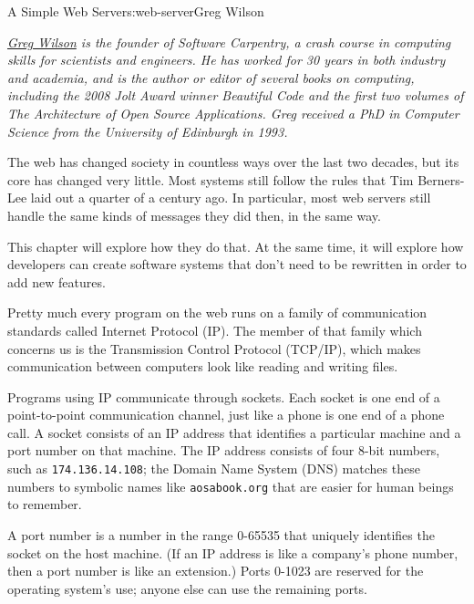 \begin{aosachapter}{A Simple Web Server}{s:web-server}{Greg Wilson}

\emph{\href{https://twitter.com/gvwilson}{Greg Wilson} is the founder of
Software Carpentry, a crash course in computing skills for scientists
and engineers. He has worked for 30 years in both industry and academia,
and is the author or editor of several books on computing, including the
2008 Jolt Award winner \emph{Beautiful Code} and the first two volumes
of \emph{The Architecture of Open Source Applications}. Greg received a
PhD in Computer Science from the University of Edinburgh in 1993.}

\label{introduction}

The web has changed society in countless ways over the last two decades,
but its core has changed very little. Most systems still follow the
rules that Tim Berners-Lee laid out a quarter of a century ago. In
particular, most web servers still handle the same kinds of messages
they did then, in the same way.

This chapter will explore how they do that. At the same time, it will
explore how developers can create software systems that don't need to be
rewritten in order to add new features.

\label{background}

Pretty much every program on the web runs on a family of communication
standards called Internet Protocol (IP). The member of that family which
concerns us is the Transmission Control Protocol (TCP/IP), which makes
communication between computers look like reading and writing files.

Programs using IP communicate through sockets. Each socket is one end of
a point-to-point communication channel, just like a phone is one end of
a phone call. A socket consists of an IP address that identifies a
particular machine and a port number on that machine. The IP address
consists of four 8-bit numbers, such as \texttt{174.136.14.108}; the
Domain Name System (DNS) matches these numbers to symbolic names like
\texttt{aosabook.org} that are easier for human beings to remember.

A port number is a number in the range 0-65535 that uniquely identifies
the socket on the host machine. (If an IP address is like a company's
phone number, then a port number is like an extension.) Ports 0-1023 are
reserved for the operating system's use; anyone else can use the
remaining ports.


\end{aosachapter}
